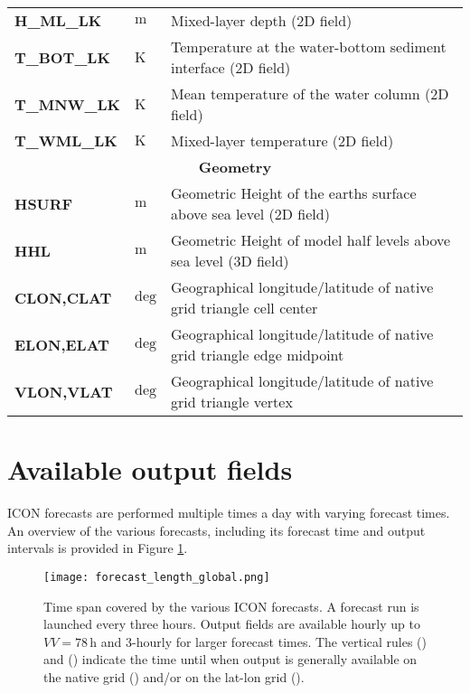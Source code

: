 \begin{longtable}{p{2.5cm}p{1.8cm}p{10.0cm}}
\textbf{H\_ML\_LK}                      &  $\mathrm{m}$               &  Mixed-layer depth (2D field)\\
\textbf{T\_BOT\_LK}                     &  $\mathrm{K}$               &  Temperature at the water-bottom sediment interface (2D field)\\
\textbf{T\_MNW\_LK}                     &  $\mathrm{K}$               &  Mean temperature of the water column (2D field)\\
\textbf{T\_WML\_LK}                     &  $\mathrm{K}$               &  Mixed-layer temperature (2D field)\\
\midrule
\multicolumn{3}{c}{\textbf{Geometry}}\\
\midrule
\textbf{HSURF}                          &  $\mathrm{m}$               &  Geometric Height of the earths surface above sea level (2D field) \\
\textbf{HHL}                            &  $\mathrm{m}$               &  Geometric Height of model half levels above sea level (3D field) \\
\textbf{CLON,CLAT}                      &  $\mathrm{deg}$             &  Geographical longitude/latitude of native grid triangle cell center \\
\textbf{ELON,ELAT}                      &  $\mathrm{deg}$             &  Geographical longitude/latitude of native grid triangle edge midpoint \\
\textbf{VLON,VLAT}                      &  $\mathrm{deg}$             &  Geographical longitude/latitude of native grid triangle vertex \\
  \bottomrule
\end{longtable}



\section{Available output fields}\label{sec_outfields}

ICON forecasts are performed multiple times a day with varying forecast times. An overview of the various forecasts, including its  
forecast time and output intervals is provided in Figure \ref{fig:forecast_length_global}.
\begin{figure}[hbt]
 \centering
 \texttt{[image: forecast\_length\_global.png]}
 \caption{Time span covered by the various ICON forecasts. A forecast run is launched every three hours.
 Output fields are available hourly up to $VV=78\,\mathrm{h}$ and 3-hourly for larger forecast times. 
 The vertical rules (\protect\markRed) and (\protect\markBlue) indicate the time until when output is generally 
 available on the native grid (\protect\markRed) and/or on the lat-lon grid (\protect\markBlue).}\label{fig:forecast_length_global}
\end{figure}


